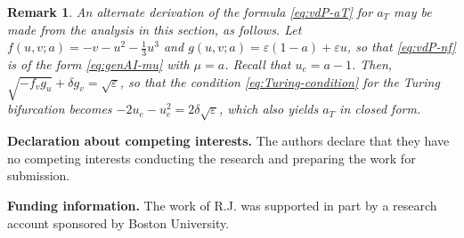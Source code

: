 \documentclass[11pt]{article}
\def\eps{\varepsilon}
\numberwithin{equation}{section}
\newtheorem{remark}{Remark}[section]
\begin{document}
\begin{remark} 
An alternate derivation of the formula \eqref{eq:vdP-aT} for $a_T$ may be made from the analysis in this section, as follows. 
Let $f(u,v;a)=-v - u^2 - \frac{1}{3}u^3$ 
and $g(u,v;a)=\eps(1-a) + \eps u$, so that \eqref{eq:vdP-nf} is of the form \eqref{eq:genAI-mu} with $\mu = a$. 
Recall that $u_e=a-1$. 
Then, $\sqrt{-f_v g_u} + \delta g_v = \sqrt{\eps}$, so that the condition \eqref{eq:Turing-condition} for the Turing bifurcation becomes $-2u_e - u_e^2 = 2\delta\sqrt{\eps}$, which also yields $a_T$ in closed form.
\end{remark}




\vspace{0.5in}

\vspace{0.1in}
\noindent
{\bf Declaration about competing interests.}
The authors declare that they have no competing interests conducting the research and preparing the work for submission.

\vspace{0.1in}
\noindent
{\bf Funding information.}
The work of R.J. was supported in part by a research account sponsored by Boston University.


\printbibliography
\end{document}
